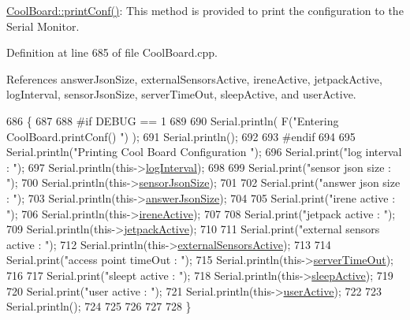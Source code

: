 \hyperlink{classCoolBoard_a486507b8f0981d3cc671ed31c2145755}{Cool\+Board\+::print\+Conf()}\+: This method is provided to print the configuration to the Serial Monitor. 

Definition at line 685 of file Cool\+Board.\+cpp.



References answer\+Json\+Size, external\+Sensors\+Active, irene\+Active, jetpack\+Active, log\+Interval, sensor\+Json\+Size, server\+Time\+Out, sleep\+Active, and user\+Active.


\begin{DoxyCode}
686 \{
687 
688 \textcolor{preprocessor}{#if DEBUG == 1}
689     
690     Serial.println( F(\textcolor{stringliteral}{"Entering CoolBoard.printConf() "}) );
691     Serial.println();
692 
693 \textcolor{preprocessor}{#endif}
694 
695     Serial.println(\textcolor{stringliteral}{"Printing Cool Board Configuration "});
696     Serial.print(\textcolor{stringliteral}{"log interval      : "});
697     Serial.println(this->\hyperlink{classCoolBoard_a4de0096d575d66b472c4c1f0111fd452}{logInterval});
698 
699     Serial.print(\textcolor{stringliteral}{"sensor json size      : "});
700     Serial.println(this->\hyperlink{classCoolBoard_a58e4b6072e3ac8b141ec0befb479208e}{sensorJsonSize});
701 
702     Serial.print(\textcolor{stringliteral}{"answer json size      : "});
703     Serial.println(this->\hyperlink{classCoolBoard_af2da1f85315b3d074a8b87d158094fb7}{answerJsonSize});
704 
705     Serial.print(\textcolor{stringliteral}{"irene active      : "});
706     Serial.println(this->\hyperlink{classCoolBoard_a9c3f7ac625481ee2ae802a25d97a4ae0}{ireneActive});
707 
708     Serial.print(\textcolor{stringliteral}{"jetpack active        : "});
709     Serial.println(this->\hyperlink{classCoolBoard_a9be03a913d26e558328935ca3b59a75e}{jetpackActive});
710 
711     Serial.print(\textcolor{stringliteral}{"external sensors active   : "});
712     Serial.println(this->\hyperlink{classCoolBoard_a638b00b76aeb819ecfd4c10b8cdd7bb7}{externalSensorsActive});
713 
714     Serial.print(\textcolor{stringliteral}{"access point timeOut  : "});
715     Serial.println(this->\hyperlink{classCoolBoard_a7a8d8d3d316220cdd049cd63c1aa8fe6}{serverTimeOut});
716 
717     Serial.print(\textcolor{stringliteral}{"sleept active         : "});
718     Serial.println(this->\hyperlink{classCoolBoard_a0a51b2287139f66c738101fb53139230}{sleepActive});
719 
720     Serial.print(\textcolor{stringliteral}{"user active       : "});
721     Serial.println(this->\hyperlink{classCoolBoard_a6395459131d6889a3005f79c7a35e964}{userActive});
722 
723     Serial.println();
724 
725 
726 
727 
728 \}
\end{DoxyCode}
\mbox{\label{classCoolBoard_ad03abdce2e65f520bbf2cff0f2d083cf}} 
